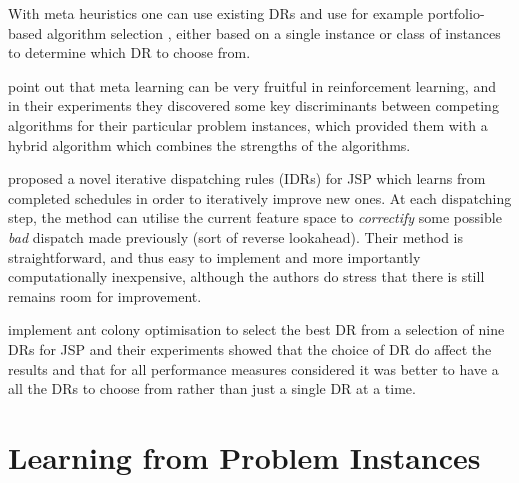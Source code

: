 \documentclass[smallextended]{svjour3}
\begin{document}

With meta heuristics one can use existing DRs and use for example 
portfolio-based algorithm selection \citep{Rice76,Gomes01}, either based on a 
single instance or class of instances \citep{Xu07} to determine which DR to 
choose from. 

\citet{Kalyanakrishnan11} point out that meta learning can be very fruitful in 
reinforcement learning, and in their experiments they discovered some key 
discriminants between competing algorithms for their particular problem 
instances, which provided them with a hybrid algorithm which combines the 
strengths of the algorithms.

\citet{Nguyen13} proposed a novel iterative dispatching rules (IDRs) for JSP 
which learns from completed schedules in order to iteratively improve new ones. 
At each dispatching step, the method can utilise the current feature space to 
\emph{correctify} some possible \emph{bad} dispatch made previously (sort of 
reverse lookahead).  Their method is straightforward, and thus easy to 
implement and more importantly computationally inexpensive, although the 
authors do stress that there is still remains room for improvement.

\citet{Korytkowski13} implement ant colony optimisation to select the best DR 
from a selection of nine DRs for JSP and their experiments showed that the 
choice of DR do affect the results and that for all performance measures 
considered it was better to have a all the DRs to choose from rather than just 
a single DR at a time. 	

\section{Learning from Problem Instances}\label{sec:gentrainingdata}
\end{document}
